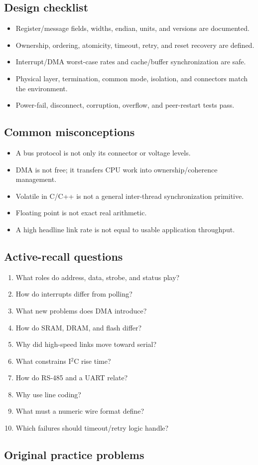 \documentclass[10pt,letterpaper]{article}
\begin{document}
\subsection{Design checklist}
\begin{itemize}
  \item Register/message fields, widths, endian, units, and versions are documented.
  \item Ownership, ordering, atomicity, timeout, retry, and reset recovery are defined.
  \item Interrupt/DMA worst-case rates and cache/buffer synchronization are safe.
  \item Physical layer, termination, common mode, isolation, and connectors match the environment.
  \item Power-fail, disconnect, corruption, overflow, and peer-restart tests pass.
\end{itemize}\subsection{Common misconceptions}
\begin{itemize}
  \item A bus protocol is not only its connector or voltage levels.
  \item DMA is not free; it transfers CPU work into ownership/coherence management.
  \item Volatile in C/C++ is not a general inter-thread synchronization primitive.
  \item Floating point is not exact real arithmetic.
  \item A high headline link rate is not equal to usable application throughput.
\end{itemize}\subsection{Active-recall questions}
\begin{enumerate}
  \item What roles do address, data, strobe, and status play?
  \item How do interrupts differ from polling?
  \item What new problems does DMA introduce?
  \item How do SRAM, DRAM, and flash differ?
  \item Why did high-speed links move toward serial?
  \item What constrains I$^2$C rise time?
  \item How do RS-485 and a UART relate?
  \item Why use line coding?
  \item What must a numeric wire format define?
  \item Which failures should timeout/retry logic handle?
\end{enumerate}\subsection{Original practice problems}
\end{document}
